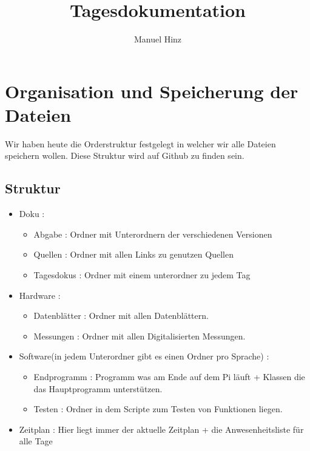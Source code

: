\documentclass{article}
\author{Manuel Hinz}
\title{Tagesdokumentation}
\begin{document}
\maketitle

\section{Organisation und Speicherung der Dateien}
Wir haben heute die Orderstruktur festgelegt in welcher wir alle Dateien speichern wollen. Diese Struktur wird auf Github zu finden sein.
\subsection{Struktur}

\begin{itemize}

\item Doku : 
\begin{itemize}

\item Abgabe : Ordner mit Unterordnern der verschiedenen Versionen

\item Quellen : Ordner mit allen Links zu genutzen Quellen 

\item Tagesdokus : Ordner mit einem unterordner zu jedem Tag

\end{itemize}

\item Hardware :
\begin{itemize}

\item Datenblätter : Ordner mit allen Datenblättern.

\item Messungen : Ordner mit allen Digitalisierten Messungen.

\end{itemize}

\item Software(in jedem Unterordner gibt es einen Ordner pro Sprache) :
\begin{itemize}

\item Endprogramm : Programm was am Ende auf dem Pi läuft + Klassen die das Hauptprogramm unterstützen.

\item Testen : Ordner in dem Scripte zum Testen von Funktionen liegen.

\end{itemize}

\item Zeitplan : Hier liegt immer der aktuelle Zeitplan + die Anwesenheitsliste für alle Tage

\end{itemize}
\end{document}
